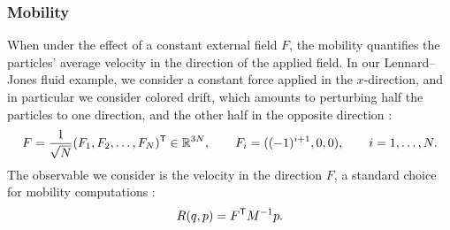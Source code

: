 \documentclass[11pt]{article}
\newcommand{\R}{\mathbb{R}}
\renewcommand{\t}{\mathsf T}
\theoremstyle{definition}
\begin{document}
\subsubsection{Mobility}
\label{subsubsec:mobility_num}
When under the effect of a constant external field $F$, the mobility quantifies the particles' average velocity in the direction of the applied field. In our Lennard--Jones fluid example, we consider a constant force applied in the $x$-direction, and in particular we consider colored drift, which amounts to perturbing half the particles to one direction, and the other half in the opposite direction \cite{evans2007}:
\begin{equation}
\notag
	F = \frac{1}{\sqrt{N}}(F_1,F_2,\dotsc,F_N)^\t \in \R^{3N}, \qquad F_i = ((-1)^{i+1}, 0, 0), \qquad i = 1,\dotsc,N.
\end{equation}
The observable we consider is the velocity in the direction $F$, a standard choice for mobility computations \cite[Section 5.2.2]{lelievre2016}:
\begin{equation}
\notag
	R(q,p) = F^\t M^{-1}p.
\end{equation}
\end{document}
